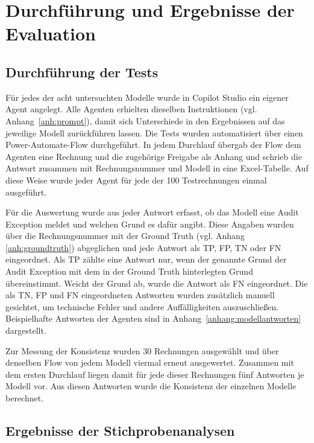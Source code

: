 \chapter{Durchführung und Ergebnisse der Evaluation}
\label{chap:evaluationsdurchfuehrung}

\section{Durchführung der Tests}
\label{sec:durchfuehrung_tests}

Für jedes der acht untersuchten Modelle wurde in Copilot Studio ein eigener Agent angelegt. Alle Agenten erhielten dieselben Instruktionen (vgl. Anhang~\ref{anh:prompt}), damit sich Unterschiede in den Ergebnissen auf das jeweilige Modell zurückführen lassen. Die Tests wurden automatisiert über einen Power-Automate-Flow durchgeführt. In jedem Durchlauf übergab der Flow dem Agenten eine Rechnung und die zugehörige Freigabe als Anhang und schrieb die Antwort zusammen mit Rechnungsnummer und Modell in eine Excel-Tabelle. Auf diese Weise wurde jeder Agent für jede der 100 Testrechnungen einmal ausgeführt.

Für die Auswertung wurde aus jeder Antwort erfasst, ob das Modell eine Audit Exception meldet und welchen Grund es dafür angibt. Diese Angaben wurden über die Rechnungsnummer mit der Ground Truth (vgl. Anhang \ref{anh:groundtruth}) abgeglichen und jede Antwort als \ac{TP}, \ac{FP}, \ac{TN} oder \ac{FN} eingeordnet. Als \ac{TP} zählte eine Antwort nur, wenn der genannte Grund der Audit Exception mit dem in der Ground Truth hinterlegten Grund übereinstimmt. Weicht der Grund ab, wurde die Antwort als \ac{FN} eingeordnet. Die als \ac{TN}, \ac{FP} und \ac{FN} eingeordneten Antworten wurden zusätzlich manuell gesichtet, um technische Fehler und andere Auffälligkeiten auszuschließen. Beispielhafte Antworten der Agenten sind in Anhang~\ref{anhang:modellantworten} dargestellt.

Zur Messung der Konsistenz wurden 30 Rechnungen ausgewählt und über denselben Flow von jedem Modell viermal erneut ausgewertet. Zusammen mit dem ersten Durchlauf liegen damit für jede dieser Rechnungen fünf Antworten je Modell vor. Aus diesen Antworten wurde die Konsistenz der einzelnen Modelle berechnet.

\section{Ergebnisse der Stichprobenanalysen}
\label{sec:ergebnisse_stichproben}

